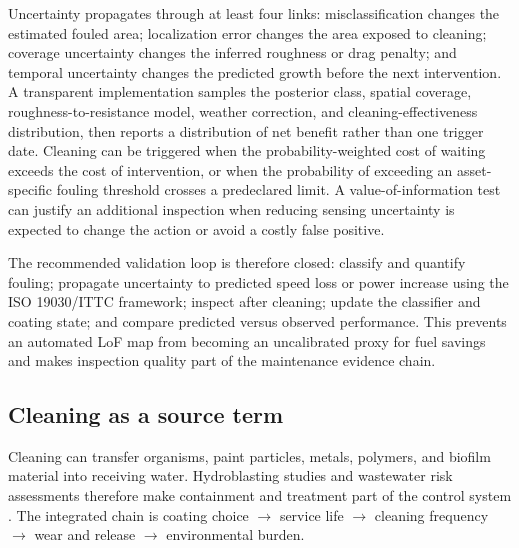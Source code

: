 Uncertainty propagates through at least four links: misclassification changes the estimated fouled area; localization error changes the area exposed to cleaning; coverage uncertainty changes the inferred roughness or drag penalty; and temporal uncertainty changes the predicted growth before the next intervention. A transparent implementation samples the posterior class, spatial coverage, roughness-to-resistance model, weather correction, and cleaning-effectiveness distribution, then reports a distribution of net benefit rather than one trigger date. Cleaning can be triggered when the probability-weighted cost of waiting exceeds the cost of intervention, or when the probability of exceeding an asset-specific fouling threshold crosses a predeclared limit. A value-of-information test can justify an additional inspection when reducing sensing uncertainty is expected to change the action or avoid a costly false positive.

The recommended validation loop is therefore closed: classify and quantify fouling; propagate uncertainty to predicted speed loss or power increase using the ISO 19030/ITTC framework; inspect after cleaning; update the classifier and coating state; and compare predicted versus observed performance. This prevents an automated LoF map from becoming an uncalibrated proxy for fuel savings and makes inspection quality part of the maintenance evidence chain.

\subsection{Cleaning as a source term}
Cleaning can transfer organisms, paint particles, metals, polymers, and biofilm material into receiving water. Hydroblasting studies and wastewater risk assessments therefore make containment and treatment part of the control system \cite{kim_qualitative_2024,soon_characterization_2021}. The integrated chain is coating choice $\rightarrow$ service life $\rightarrow$ cleaning frequency $\rightarrow$ wear and release $\rightarrow$ environmental burden.
